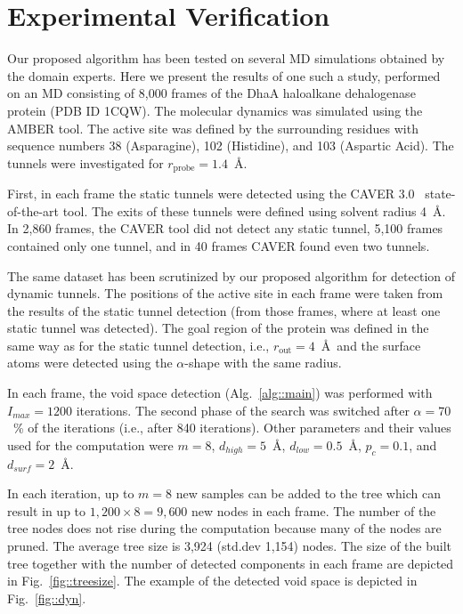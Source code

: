 \documentclass[usletter, 10pt, conference]{svjour3}      %
\def\Imax{I_{max}} %
\def\dts{d_{surf}}
\def\da{d_{high}}
\def\db{d_{low}}
\def\probe{r_{\mathrm{probe}}}
\def\gprobe{r_{\mathrm{out}}}
\def\gb{p_{c}}
\begin{document}
\section{Experimental Verification}

Our proposed algorithm has been tested on several MD simulations obtained by the domain experts. 
Here we present the results of one such a study, performed on an MD consisting of 8,000 frames of the DhaA haloalkane dehalogenase protein (PDB ID 1CQW).
The molecular dynamics was simulated using the AMBER tool.
The active site was defined by the surrounding residues with sequence numbers 38 (Asparagine), 102 (Histidine), and 103 (Aspartic Acid).
The tunnels were investigated for $\probe=1.4$~\AA.


First, in each frame the static tunnels were detected using the CAVER 3.0~\cite{caver3} state-of-the-art tool.
The exits of these tunnels were defined using solvent radius 4~\AA.
In 2,860 frames, the CAVER tool did not detect any static tunnel, 5,100 frames contained only one tunnel, and in 40 frames CAVER found even two tunnels.

The same dataset has been scrutinized by our proposed algorithm for detection of dynamic tunnels.
The positions of the active site in each frame were taken from the results of the static tunnel detection (from those frames, where at least
one static tunnel was detected).
The goal region of the protein was defined in the same way as for the static tunnel detection, i.e., $\gprobe=4$~\AA\ and 
the surface atoms were detected using the $\alpha$-shape with the same radius.

In each frame, the void space detection (Alg.~\ref{alg::main}) was performed with $\Imax=1200$ iterations.
The second phase of the search was switched after $\alpha=70$~\% of the iterations (i.e., after 840 iterations).
Other parameters and their values used for the computation were $m=8$, $\da=5$~\AA, $\db=0.5$~\AA, $\gb=0.1$, and $\dts=2$~\AA.

In each iteration, up to $m=8$ new samples can be added to the tree which can result in up to $1,200 \times 8 = 9,600$ new nodes in each frame. 
The number of the tree nodes does not rise during the computation because many of the nodes are pruned.
The average tree size is 3,924 (std.dev 1,154) nodes.
The size of the built tree together with the number of detected components in each frame are depicted in Fig.~\ref{fig::treesize}.
The example of the detected void space is depicted in Fig.~\ref{fig::dyn}.
\end{document}
